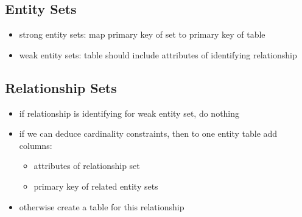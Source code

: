 \documentclass[]{article}
\theoremstyle{definition}
\begin{document}
	\subsection{Entity Sets}
	\begin{itemize}
		\item strong entity sets: map primary key of set to primary key of table
		\item weak entity sets: table should include attributes of identifying relationship
	\end{itemize}

	\subsection{Relationship Sets}
	\begin{itemize}
		\item if relationship is identifying for weak entity set, do nothing
		\item if we can deduce cardinality constraints, then to one entity table add columns:
			\begin{itemize}
				\item attributes of relationship set
				\item primary key of related entity sets
			\end{itemize}
		\item otherwise create a table for this relationship
	\end{itemize}





		
\end{document}
